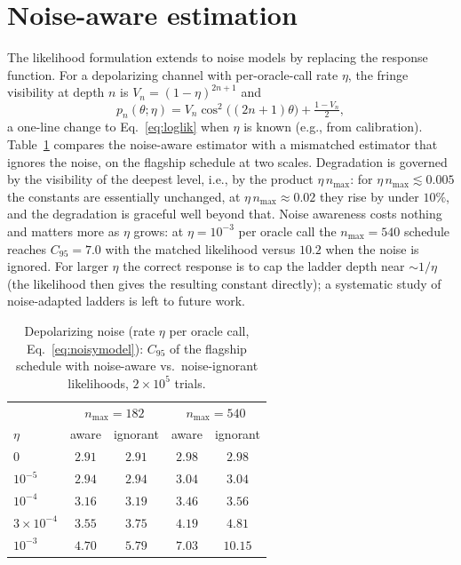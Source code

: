 \documentclass[%
 twocolumn,
 amsmath,amssymb,
prx,
longbibliography
]{revtex4-2}
\begin{document}
\section{Noise-aware estimation}\label{sec:noise}

The likelihood formulation extends to noise models by replacing the response function. For a depolarizing channel with per-oracle-call rate $\eta$, the fringe visibility at depth $n$ is $V_n = (1-\eta)^{2n+1}$ and
\begin{equation}\label{eq:noisymodel}
    p_n(\theta; \eta) = V_n \cos^2\!\big((2n+1)\theta\big) + \tfrac{1 - V_n}{2},
\end{equation}
a one-line change to Eq.~\eqref{eq:loglik} when $\eta$ is known (e.g., from calibration). Table~\ref{tab:noise} compares the noise-aware estimator with a mismatched estimator that ignores the noise, on the flagship schedule at two scales. Degradation is governed by the visibility of the deepest level, i.e., by the product $\eta\, n_{\max}$: for $\eta\, n_{\max} \lesssim 0.005$ the constants are essentially unchanged, at $\eta\, n_{\max} \approx 0.02$ they rise by under $10\%$, and the degradation is graceful well beyond that. Noise awareness costs nothing and matters more as $\eta$ grows: at $\eta = 10^{-3}$ per oracle call the $n_{\max} = 540$ schedule reaches $C_{95} = 7.0$ with the matched likelihood versus $10.2$ when the noise is ignored. For larger $\eta$ the correct response is to cap the ladder depth near $\sim 1/\eta$ (the likelihood then gives the resulting constant directly); a systematic study of noise-adapted ladders is left to future work.

\begin{table}[t]
\caption{\label{tab:noise}Depolarizing noise (rate $\eta$ per oracle call, Eq.~\eqref{eq:noisymodel}): $C_{95}$ of the flagship schedule with noise-aware vs.\ noise-ignorant likelihoods, $2\times 10^5$ trials.}
\begin{ruledtabular}
\begin{tabular}{lcccc}
 & \multicolumn{2}{c}{$n_{\max} = 182$} & \multicolumn{2}{c}{$n_{\max} = 540$} \\
$\eta$ & aware & ignorant & aware & ignorant \\
\hline
$0$              & $2.91$ & $2.91$ & $2.98$ & $2.98$ \\
$10^{-5}$        & $2.94$ & $2.94$ & $3.04$ & $3.04$ \\
$10^{-4}$        & $3.16$ & $3.19$ & $3.46$ & $3.56$ \\
$3\times10^{-4}$ & $3.55$ & $3.75$ & $4.19$ & $4.81$ \\
$10^{-3}$        & $4.70$ & $5.79$ & $7.03$ & $10.15$ \\
\end{tabular}
\end{ruledtabular}
\end{table}
\end{document}
